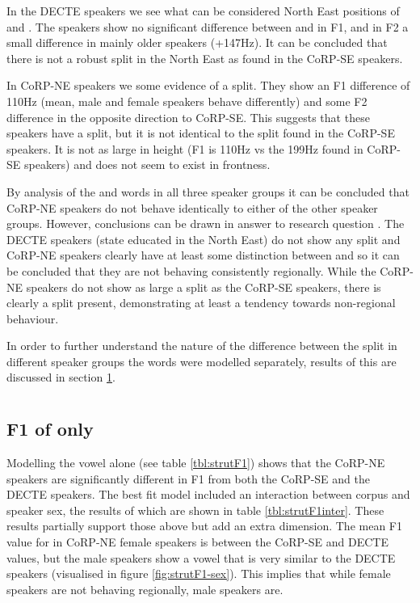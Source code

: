 \documentclass[../../../00.FullDoc/tex/APRReport-year4]{subfiles}
\begin{document}
In the DECTE speakers we see what can be considered  North East \FS{} positions of \foot{} and \strutt{}. The speakers show no significant difference between \foot{} and \strutt{} in F1, and in F2 a small difference in mainly older speakers (+147Hz). It can be concluded that there is not a robust \FS{} split in the North East as found in the CoRP-SE speakers.

In CoRP-NE speakers we some evidence of a split. They show an F1 difference of 110Hz (mean, male and female speakers behave differently) and some F2 difference in the opposite direction to CoRP-SE. This suggests that these speakers have a split, but it is not identical to the split found in the CoRP-SE speakers. It is not as large in height (F1 is 110Hz vs the 199Hz found in CoRP-SE speakers) and does not seem to exist in frontness.

By analysis of the \foot{} and \strutt{} words in all three speaker groups it can be concluded that CoRP-NE speakers do not behave identically to either of the other speaker groups. However, conclusions can be drawn in answer to research question \notinsubfile{\ref{RQ1}}. The DECTE speakers (state educated in the North East) do not show any \FS{} split and CoRP-NE speakers clearly have at least some distinction between \foot{} and \strutt{} so it can be concluded that they are not behaving consistently regionally. While the CoRP-NE speakers do not show as large a split as the CoRP-SE speakers, there is clearly a split present, demonstrating at least a tendency towards non-regional behaviour.

In order to further understand the nature of the difference between the split in different speaker groups the \strutt{} words were modelled separately, results of this are discussed in section \ref{sec:FSSTRUT}.

\section{} \label{sec:FSSTRUT}
\subsection{F1 of  only}

Modelling the \strutt{} vowel alone (see table \ref{tbl:strutF1}) shows that the CoRP-NE speakers are significantly different in F1 from both the CoRP-SE and the DECTE speakers. The best fit model included an interaction between corpus and speaker sex, the results of which are shown in table \ref{tbl:strutF1inter}. These results partially support those above but add an extra dimension. The mean F1 value for \strutt{} in CoRP-NE female speakers is between the CoRP-SE and DECTE values, but the male speakers show a vowel that is very similar to the DECTE speakers (visualised in figure \ref{fig:strutF1-sex}). This implies that while female speakers are not behaving regionally, male speakers are.
\end{document}
